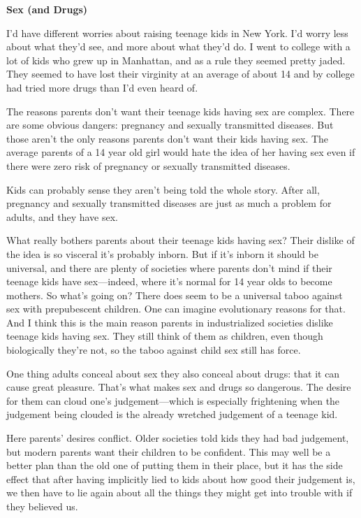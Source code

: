 \textbf{Sex (and Drugs)}

I'd have different worries about raising teenage kids in New York. I'd
worry less about what they'd see, and more about what they'd do. I went
to college with a lot of kids who grew up in Manhattan, and as a rule
they seemed pretty jaded. They seemed to have lost their virginity at an
average of about 14 and by college had tried more drugs than I'd even
heard of.

The reasons parents don't want their teenage kids having sex are
complex. There are some obvious dangers: pregnancy and sexually
transmitted diseases. But those aren't the only reasons parents don't
want their kids having sex. The average parents of a 14 year old girl
would hate the idea of her having sex even if there were zero risk of
pregnancy or sexually transmitted diseases.

Kids can probably sense they aren't being told the whole story. After
all, pregnancy and sexually transmitted diseases are just as much a
problem for adults, and they have sex.

What really bothers parents about their teenage kids having sex? Their
dislike of the idea is so visceral it's probably inborn. But if it's
inborn it should be universal, and there are plenty of societies where
parents don't mind if their teenage kids have sex---indeed, where it's
normal for 14 year olds to become mothers. So what's going on? There
does seem to be a universal taboo against sex with prepubescent
children. One can imagine evolutionary reasons for that. And I think
this is the main reason parents in industrialized societies dislike
teenage kids having sex. They still think of them as children, even
though biologically they're not, so the taboo against child sex still
has force.

One thing adults conceal about sex they also conceal about drugs: that
it can cause great pleasure. That's what makes sex and drugs so
dangerous. The desire for them can cloud one's judgement---which is
especially frightening when the judgement being clouded is the already
wretched judgement of a teenage kid.

Here parents' desires conflict. Older societies told kids they had bad
judgement, but modern parents want their children to be confident. This
may well be a better plan than the old one of putting them in their
place, but it has the side effect that after having implicitly lied to
kids about how good their judgement is, we then have to lie again about
all the things they might get into trouble with if they believed us.

